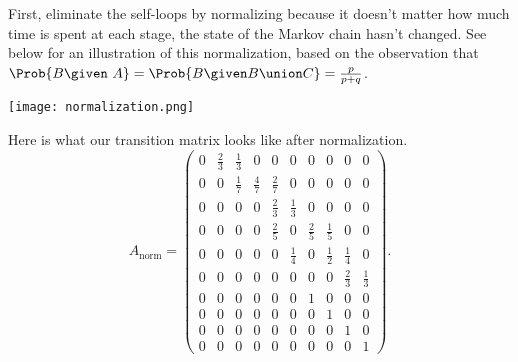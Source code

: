 \documentclass[12pt]{article}
\begin{document}
\begin{solution}
\begin{enumerate}[label=(\alph*)]
        First, eliminate the self-loops by normalizing because it
        doesn't matter how much time is spent at each stage, the state
        of the Markov chain hasn't changed.  See below for an
        illustration of this normalization, based on the observation
        that \( \Prob{B \given ~A} = \Prob{B \given B \union C} = \frac{p}
        {p+q} \).

        \texttt{[image: normalization.png]}

        Here is what our transition matrix looks like after
        normalization.
        \[
            A_{\text{norm}} =
            \begin{pmatrix}
                0 & \frac{2}{3} & \frac{1}{3} & 0 & 0 & 0 & 0 & 0 & 0 &
                0\\
                0 & 0 & \frac{1}{7} & \frac{4}{7} & \frac{2}{7} & 0 & 0
                & 0 & 0 & 0\\
                0 & 0 & 0 & 0 & \frac{2}{3} & \frac{1}{3} & 0 & 0 & 0 &
                0\\
                0 & 0 & 0 & 0 & \frac{2}{5} & 0 & \frac{2}{5} & \frac{1}
                {5} & 0 & 0\\
                0 & 0 & 0 & 0 & 0 & \frac{1}{4} & 0 & \frac{1}{2} &
                \frac{1}{4} & 0\\
                0 & 0 & 0 & 0 & 0 & 0 & 0 & 0 & \frac{2}{3} & \frac{1}{3}\\
                0 & 0 & 0 & 0 & 0 & 0 & 1 & 0 & 0 & 0\\
                0 & 0 & 0 & 0 & 0 & 0 & 0 & 1 & 0 & 0\\
                0 & 0 & 0 & 0 & 0 & 0 & 0 & 0 & 1 & 0\\
                0 & 0 & 0 & 0 & 0 & 0 & 0 & 0 & 0 & 1
            \end{pmatrix}
            .
        \]


\end{enumerate}
\end{solution}
\end{document}

